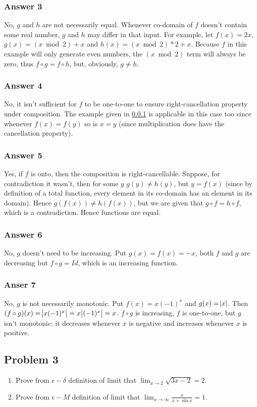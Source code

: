 \documentclass[a4paper]{article}
\begin{document}
\subsubsection{Answer 3}
\label{sec-1-2-1}
No, $g$ and $h$ are not necessarily equal.  Whenever co-domain of $f$
doesn't contain some real number, $g$ and $h$ may differ in that input.
For example, let $f(x) = 2x$, $g(x) = (x \bmod 2) + x$ and
$h(x) = (x \bmod 2) * 2 + x$.  Because $f$ in this example will only
generate even numbers, the $(x \bmod 2)$ term will always be zero,
thus $f \circ g = f \circ h$, but, obviously, $g \neq h$.
\subsubsection{Answer 4}
\label{sec-1-2-2}
No, it isn't sufficient for $f$ to be one-to-one to ensure right-cancellation
property under composition.  The example given in \ref{sec-1-2-1} is applicable
in this case too since whenever $f(x) = f(y)$ so is $x = y$ (since multiplication
does have the cancellation property).
\subsubsection{Answer 5}
\label{sec-1-2-3}
Yes, if $f$ is onto, then the composition is right-cancellable.  Suppose,
for contradiction it wasn't, then for some $y$ $g(y) \neq h(y)$, but
$y = f(x)$ (since by definition of a total function, every element in
its co-domain has an element in its domain).  Hence $g(f(x)) \neq h(f(x))$,
but we are given that $g \circ f = h \circ f$, which is a contradiction.
Hence functions are equal.
\subsubsection{Answer 6}
\label{sec-1-2-4}
No, $g$ doesn't need to be increasing.  Put $g(x) = f(x) = -x$, both $f$
and $g$ are decreasing but $f \circ g = Id$, which is an increasing function.
\subsubsection{Anser 7}
\label{sec-1-2-5}
No, $g$ is not necessarily monotonic.  Put $f(x) = x(-1)^x$ and $g(x) = \abs{x}$.
Then $(f \circ g)(x) = \abs{x(-1)^x} = x\abs{(-1)^x} = x$.  $f \circ g$ is
increasing, $f$ is one-to-one, but $g$ isn't monotonic: it decreases whenever
$x$ is negative and increases whenever $x$ is positive.
\subsection{Problem 3}
\label{sec-1-3}
\begin{enumerate}
\item Prove from $\epsilon-\delta$ definition of limit that 
      $\lim_{x \to 2}\sqrt{3x - 2} = 2$.
\item Prove from $\epsilon-M$ definition of limit that 
      $\lim_{x \to \infty}\frac{x}{x+\sin x} = 1$.
\end{enumerate}
\end{document}
